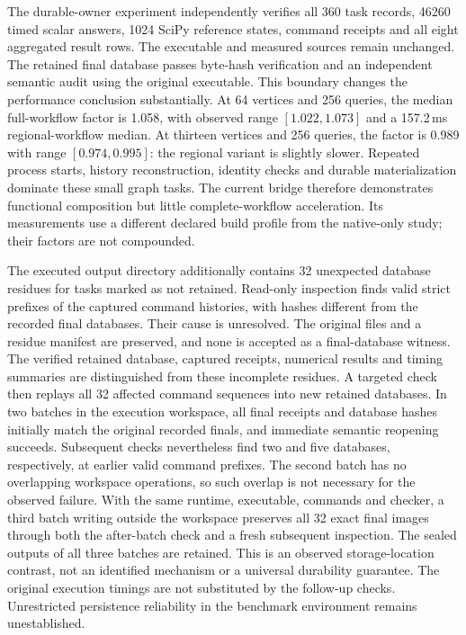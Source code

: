 \documentclass[11pt,a4paper]{article}
\theoremstyle{definition}\newtheorem{definition}[theorem]{Definition}
\begin{document}

The durable-owner experiment independently verifies all 360 task records,
46260 timed scalar answers, 1024 SciPy reference states, command receipts and
all eight aggregated result rows. The executable and measured sources remain
unchanged. The retained final database passes byte-hash verification and an
independent semantic audit using the original executable. This boundary
changes the performance conclusion substantially. At 64 vertices and 256
queries, the median full-workflow factor is 1.058, with observed range
$[1.022,1.073]$ and a 157.2\,ms regional-workflow median. At thirteen vertices
and 256 queries, the factor is 0.989 with range $[0.974,0.995]$: the regional
variant is slightly slower. Repeated process starts, history reconstruction,
identity checks and durable materialization dominate these small graph tasks.
The current bridge therefore demonstrates functional composition but little
complete-workflow acceleration. Its measurements use a different declared
build profile from the native-only study; their factors are not compounded.

The executed output directory additionally contains 32 unexpected database
residues for tasks marked as not retained. Read-only inspection finds valid
strict prefixes of the captured command histories, with hashes different from
the recorded final databases. Their cause is unresolved. The original files
and a residue manifest are preserved, and none is accepted as a final-database
witness. The verified retained database, captured receipts, numerical results
and timing summaries are distinguished from these incomplete residues.
A targeted check then replays all 32 affected command sequences into new
retained databases. In two batches in the execution workspace, all final
receipts and database hashes initially match the original recorded finals,
and immediate semantic reopening succeeds. Subsequent checks nevertheless
find two and five databases, respectively, at earlier valid command prefixes.
The second batch has no overlapping workspace operations, so such overlap
is not necessary for the observed failure. With the same runtime, executable,
commands and checker, a third batch writing outside the workspace preserves
all 32 exact final images through both the after-batch check and a fresh
subsequent inspection. The sealed outputs of all three batches are retained.
This is an observed storage-location contrast, not an identified mechanism
or a universal durability guarantee. The original execution timings are not
substituted by the follow-up checks. Unrestricted persistence reliability in
the benchmark environment remains unestablished.
\end{document}
